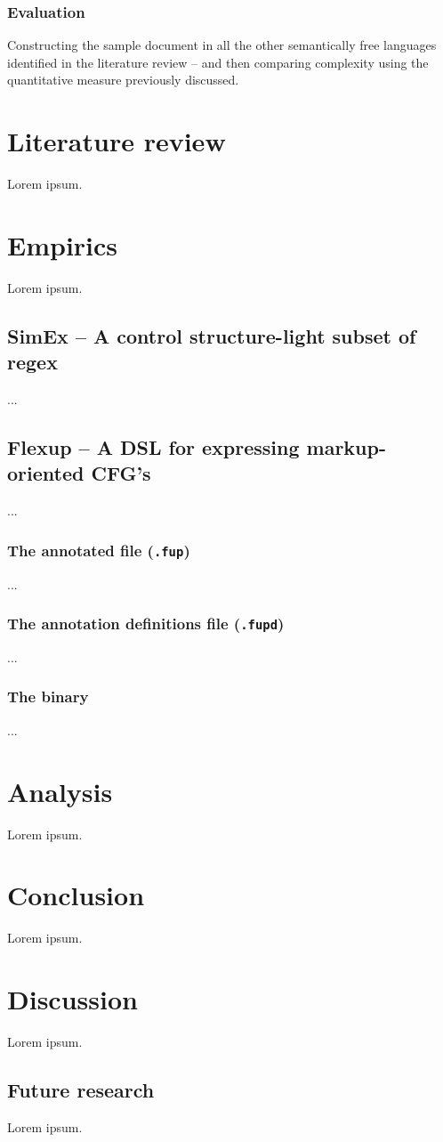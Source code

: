 \documentclass{scrreprt}
\begin{document}
\subsection{Evaluation}
Constructing the sample document in all the other semantically free languages identified in the literature review -- and then comparing complexity using the quantitative measure previously discussed.






\chapter{Literature review}
Lorem ipsum.






\chapter{Empirics}
Lorem ipsum.


\section{SimEx -- A control structure-light subset of regex}
...


\section{Flexup -- A DSL for expressing markup-oriented CFG's}
...

\subsection{The annotated file (\texttt{.fup})}
...

\subsection{The annotation definitions file (\texttt{.fupd})}
...

\subsection{The binary}
...





\chapter{Analysis}
Lorem ipsum.





\chapter{Conclusion}
Lorem ipsum.





\chapter{Discussion}
Lorem ipsum.

\section{Future research}
Lorem ipsum.
\end{document}
